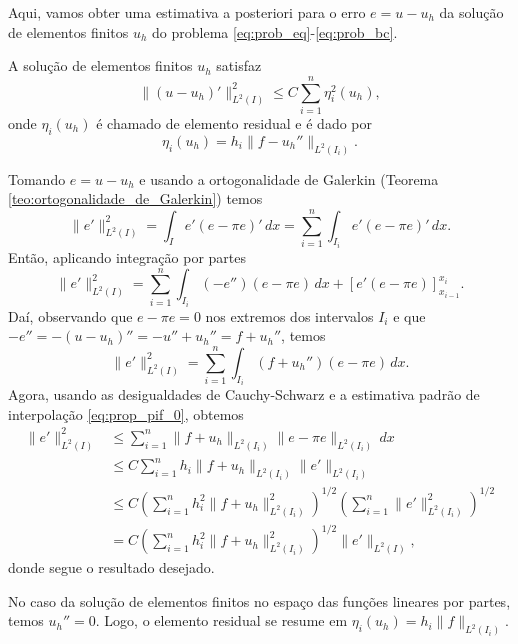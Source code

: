 Aqui, vamos obter uma estimativa a posteriori para o erro $e = u - u_h$ da solução de elementos finitos $u_h$ do problema \eqref{eq:prob_eq}-\eqref{eq:prob_bc}.

\begin{teo}\label{teo:fem_est_a_posteriori}
  A solução de elementos finitos $u_h$ satisfaz
  \begin{equation}
    \|(u-u_h)'\|_{L^2(I)}^2 \leq C\sum_{i=1}^n \eta_i^2(u_h),
  \end{equation}
onde $\eta_i(u_h)$ é chamado de elemento residual e é dado por
\begin{equation}
  \eta_i(u_h) = h_i\|f - u_h''\|_{L^2(I_i)}.
\end{equation}
\end{teo}
\begin{dem}
  Tomando $e = u - u_h$ e usando a ortogonalidade de Galerkin (Teorema \ref{teo:ortogonalidade_de_Galerkin}) temos
  \begin{equation}
    \|e'\|_{L^2(I)}^2 = \int_I e'(e-\pi e)'\,dx = \sum_{i=1}^n\int_{I_i} e'(e-\pi e)'\,dx.
  \end{equation}
  Então, aplicando integração por partes
  \begin{equation}
    \|e'\|_{L^2(I)}^2 = \sum_{i=1}^n\int_{I_i}(-e'')(e-\pi e)\,dx + [e'(e-\pi e)]_{x_{i-1}}^{x_i}.
  \end{equation}
  Daí, observando que $e-\pi e = 0$ nos extremos dos intervalos $I_i$ e que $-e'' = -(u-u_h)'' = -u'' + u_h'' = f + u_h''$, temos
  \begin{equation}
    \|e'\|_{L^2(I)}^2 = \sum_{i=1}^n\int_{I_i}(f+u_h'')(e-\pi e)\,dx.
  \end{equation}
  Agora, usando as desigualdades de Cauchy-Schwarz e a estimativa padrão de interpolação \eqref{eq:prop_pif_0}, obtemos
  \begin{align}
    \|e'\|_{L^2(I)}^2 &\leq \sum_{i=1}^n\|f+u_h\|_{L^2(I_i)}\|e-\pi e\|_{L^2(I_i)}\,dx\\
    &\leq C\sum_{i=1}^nh_i\|f+u_h\|_{L^2(I_i)}\|e'\|_{L^2(I_i)}\\
    &\leq C\left(\sum_{i=1}^n h_i^2\|f+u_h\|_{L^2(I_i)}^2\right)^{1/2}\left(\sum_{i=1}^n \|e'\|_{L^2(I_i)}^2\right)^{1/2}\\
    &= C\left(\sum_{i=1}^n h_i^2\|f+u_h\|_{L^2(I_i)}^2\right)^{1/2}\|e'\|_{L^2(I)},
  \end{align}
  donde segue o resultado desejado.
\end{dem}

\begin{obs}
  No caso da solução de elementos finitos no espaço das funções lineares por partes, temos $u_h'' = 0$. Logo, o elemento residual se resume em $\eta_i(u_h) = h_i\|f\|_{L^2(I_i)}$.
\end{obs}

